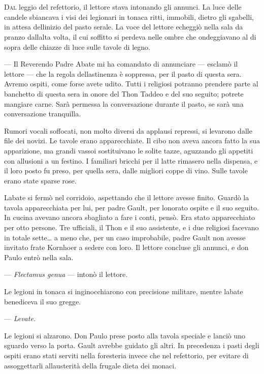 	\chapter{\phantom{title}}

\lettrine{D}{al} leggio del refettorio, il lettore stava intonando gli annunci. La
luce delle candele sbiancava i visi dei legionari in tonaca ritti,
immobili, dietro gli sgabelli, in attesa dell\textquotesingle inizio del
pasto serale. La voce del lettore echeggiò nella sala da pranzo
dall\textquotesingle alta volta, il cui soffitto si perdeva nelle ombre
che ondeggiavano al di sopra delle chiazze di luce sulle tavole di
legno.

--- Il Reverendo Padre Abate mi ha comandato di annunciare --- esclamò
il lettore --- che la regola dell\textquotesingle astinenza è soppressa,
per il pasto di questa sera. Avremo ospiti, come forse avete udito.
Tutti i religiosi potranno prendere parte al banchetto di questa sera in
onore del Thon Taddeo e del suo seguito; potrete mangiare carne. Sarà
permessa la conversazione durante il pasto, se sarà una conversazione
tranquilla.

Rumori vocali soffocati, non molto diversi da applausi repressi, si
levarono dalle file dei novizi. Le tavole erano apparecchiate. Il cibo
non aveva ancora fatto la sua apparizione, ma grandi vassoi sostituivano
le solite tazze, aguzzando gli appetiti con allusioni a un festino. I
familiari bricchi per il latte rimasero nella dispensa, e il loro posto
fu preso, per quella sera, dalle migliori coppe di vino. Sulle tavole
erano state sparse rose.

L\textquotesingle abate si fermò nel corridoio, aspettando che il
lettore avesse finito. Guardò la tavola apparecchiata per lui, per padre
Gault, per l\textquotesingle onorato ospite e il suo seguito. In cucina
avevano ancora sbagliato a fare i conti, pensò. Era stato apparecchiato
per otto persone. Tre ufficiali, il Thon e il suo assistente, e i due
religiosi facevano in totale sette\ldots{} a meno che, per un caso
improbabile, padre Gault non avesse invitato frate Kornhoer a sedere con
loro. Il lettore concluse gli annunci, e don Paulo entrò nella sala.

--- \emph{Flectamus genua} --- intonò il lettore.

Le legioni in tonaca si inginocchiarono con precisione militare, mentre
l\textquotesingle abate benediceva il suo gregge.

--- \emph{Levate.}

Le legioni si alzarono. Don Paulo prese posto alla tavola speciale e
lanciò uno sguardo verso la porta. Gault avrebbe guidato gli altri. In
precedenza i pasti degli ospiti erano stati serviti nella foresteria
invece che nel refettorio, per evitare di assoggettarli
all\textquotesingle austerità della frugale dieta dei monaci.

